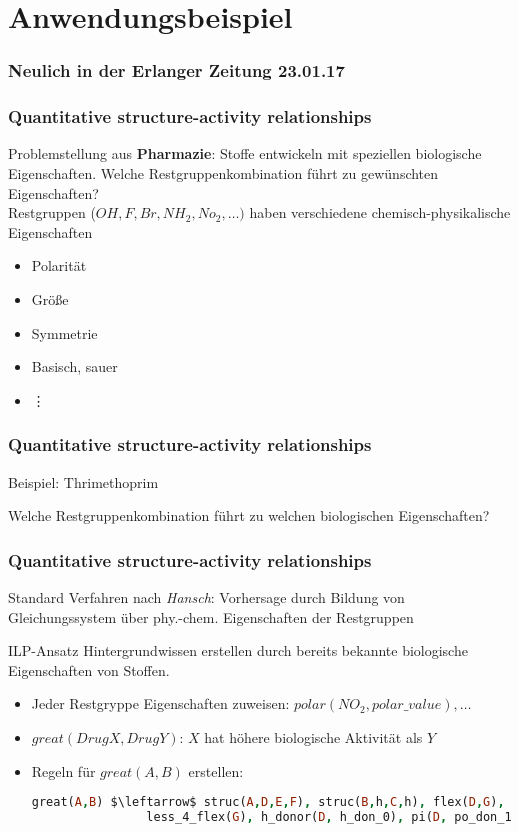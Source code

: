\section{Anwendungsbeispiel}
\begin{frame}
	\frametitle{Neulich in der Erlanger Zeitung 23.01.17}
\end{frame}

\begin{frame}
	\frametitle{Quantitative structure-activity relationships}
	Problemstellung aus \textbf{Pharmazie}: Stoffe entwickeln mit speziellen biologische Eigenschaften.
	Welche Restgruppenkombination führt zu gewünschten Eigenschaften?\\

	Restgruppen ($OH, F, Br, NH_2, No_2, \ldots)$ haben verschiedene
	chemisch-physikalische Eigenschaften
	\begin{itemize}
		\item Polarität
		\item Größe
		\item Symmetrie
		\item Basisch, sauer
		\item {\hspace{5pt}\vdots}
	\end{itemize}
\end{frame}
\begin{frame}
	\frametitle{Quantitative structure-activity relationships}
	\begin{block}{Beispiel: Thrimethoprim}
	\end{block}
	Welche Restgruppenkombination führt zu welchen biologischen Eigenschaften?
\end{frame}
\begin{frame}[fragile]
	\frametitle{Quantitative structure-activity relationships}
	Standard Verfahren nach \textit{Hansch}: Vorhersage durch Bildung von
	Gleichungssystem über phy.-chem. Eigenschaften der Restgruppen

	\begin{block}{ILP-Ansatz}
	Hintergrundwissen erstellen durch bereits bekannte biologische Eigenschaften
	von Stoffen.
	\begin{itemize}
		\item Jeder Restgryppe Eigenschaften zuweisen: $polar(NO_2, polar\_value), \ldots$
		\item $great(DrugX, DrugY)$: $X$ hat höhere biologische Aktivität als $Y$
		\item Regeln für $great(A,B)$ erstellen: 
			\begin{lstlisting}[language=prolog]
				great(A,B) $\leftarrow$ struc(A,D,E,F), struc(B,h,C,h), flex(D,G),
				less_4_flex(G), h_donor(D, h_don_0), pi(D, po_don_1).
			\end{lstlisting}
	\end{itemize}
	\end{block}
\end{frame}

